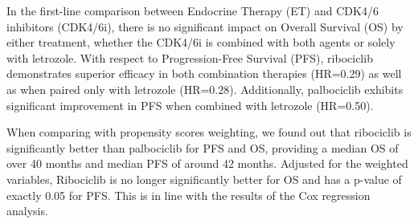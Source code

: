 In the first-line comparison between Endocrine Therapy (ET) and CDK4/6 inhibitors (CDK4/6i), there is no significant impact on Overall Survival (OS) by either treatment, whether the CDK4/6i is combined with both agents or solely with letrozole. With respect to Progression-Free Survival (PFS), ribociclib demonstrates superior efficacy in both combination therapies (HR=0.29) as well as when paired only with letrozole (HR=0.28). Additionally, palbociclib exhibits significant improvement in PFS when combined with letrozole (HR=0.50).


When comparing with propensity scores weighting, we found out that ribociclib is significantly better than palbociclib for PFS and OS, providing a median OS of over 40 months and median PFS of around 42 months. Adjusted for the weighted variables, Ribociclib is no longer significantly better for OS and has a p-value of exactly 0.05 for PFS. This is in line with the results of the Cox regression analysis.


